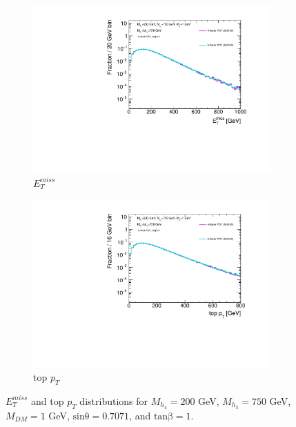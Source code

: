 \begin{figure} \centering
  \begin{subfigure}[b]{0.49\textwidth}           
    \includegraphics[width=\textwidth]{texinputs/04_grid/figures/DMHF/4v5flavour/MDM_1_Ma_200_MA_750_sinp_0.7071_tanb_1.0_4F_v_5F/metlog.pdf}
    \caption{$E_{T}^{miss}$}
  \end{subfigure}
  \begin{subfigure}[b]{0.49\textwidth}
    \includegraphics[width=\textwidth]{texinputs/04_grid/figures/DMHF/4v5flavour/MDM_1_Ma_200_MA_750_sinp_0.7071_tanb_1.0_4F_v_5F/topptlog.pdf}
    \caption{top $p_{T}$}
  \end{subfigure}
  \caption{$E_{T}^{miss}$ and top $p_{T}$ distributions for $M_{h_{4}}=200$ GeV, $M_{h_{3}}=750$ GeV, $M_{DM}=1$ GeV, $\mathrm{sin\theta}=0.7071$, and $\mathrm{tan\beta}=1$.}
  \label{fig:4v5_Ma200_MA750}
\end{figure}

